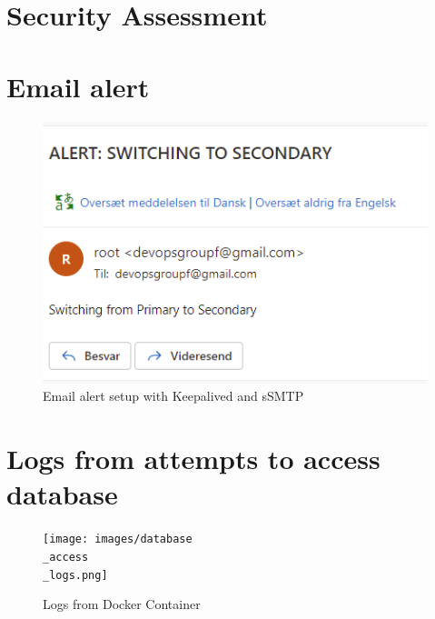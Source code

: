 \newpage
\section{Security Assessment}\label{app:SecurityAssessment}



\section{Email alert}\label{app:alert}
\begin{figure}[H]
    \centering
    \includegraphics[width = \textwidth]{images/alert.png}
    \caption{Email alert setup with Keepalived and sSMTP}
\end{figure}

\section{Logs from attempts to access database}
\begin{figure}[H]
    \label{app:DB logs}
    \centering
    \texttt{[image: images/database\\\_access\\\_logs.png]}
    \caption{Logs from Docker Container}
\end{figure}